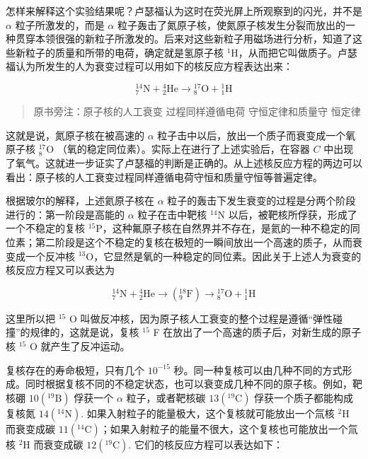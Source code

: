 怎样来解释这个实验结果呢？卢瑟福认为这时在荧光屏上所观察到的闪光，并不是
\(\alpha\) 粒子所激发的，而是 \(\alpha\)
粒子轰击了氮原子核，使氮原子核发生分裂而放出的一种贯穿本领很强的新粒子所激发的。后来对这些新粒子用磁场进行分析，知道了这些新粒子的质量和所带的电荷，确定就是氢原子核
\(^{1}\mathrm{H}\)，从而把它叫做质子。卢瑟福认为所发生的人为衰变过程可以用如下的核反应方程表达出来：

\[
{ } _ {7}^{14}\mathrm{N}+{ } _ {2}^{4}\mathrm{He}\longrightarrow { } _ {8}^{17}\mathrm{O}+{ } _ {1}^{1}\mathrm{H}
\]

\begin{quote}
原书旁注：原子核的人工衰变 过程同样遵循电荷 守恒定律和质量守 恒定律
\end{quote}

这就是说，氮原子核在被高速的 \(\alpha\)
粒子击中以后，放出一个质子而衰变成一个氧原子核 \({}^{17}_{8}\mathrm{O}\)
（氧的稳定同位素）。实际上在进行了上述实验后，在容器 \(C\)
中出现了氧气。这就进一步证实了卢瑟福的判断是正确的。从上述核反应方程的两边可以看出：原子核的人工衰变过程同样遵循电荷守恒和质量守恒等普遍定律。

根据玻尔的解释，上述氦原子核在 \(\alpha\)
粒子的轰击下发生衰变的过程是分两个阶段进行的：第一阶段是高能的
\(\alpha\) 粒子在击中靶核 \(^{14}\mathrm{N}\)
以后，被靶核所俘获，形成了一个不稳定的复核
\(^{15}\mathrm{P}\)，这种氟原子核在自然界并不存在，是氦的一种不稳定的同位素；第二阶段是这个不稳定的复核在极短的一瞬间放出一个高速的质子，从而衰变成一个反冲核
\(^{13}\mathrm{O}\)，它显然是氧的一种稳定的同位素。因此关于上述人为衰变的核反应方程又可以表达为

\[
{ } _ {7}^{14}\mathrm{N}+{ } _ {2}^{4}\mathrm{He}\longrightarrow ( { } _ {9}^{18}\mathrm{F})\longrightarrow { } _ {8}^{17}\mathrm{O}+{ } _ {1}^{1}\mathrm{H}
\]

这里所以把 \(^{15}\) O
叫做反冲核，因为原子核人工衰变的整个过程是遵循``弹性碰撞''的规律的，这就是说，复核
\(^{15}\) F 在放出了一个高速的质子后，对新生成的原子核 \(^{15}\) O
就产生了反冲运动。

复核存在的寿命极短，只有几个 \(10^{-15}\)
秒。同一种复核可以由几种不同的方式形成。同时根据复核不同的不稳定状态，也可以衰变成几种不同的原子核。例如，靶核硼
\(10(^{19}\mathrm{B})\) 俘获一个 \(\alpha\) 粒子，或者靶核碳
\(13(^{19}\mathrm{C})\) 俘获一个质子都能构成复核氮
\(14(^{14}\mathrm{N})\).
如果入射粒子的能量极大，这个复核就可能放出一个氚核 \({}^{2}\mathrm{H}\)
而衰变成碳
\(11(^{14}\mathrm{C})\)；如果入射粒子的能量不很大，这个复核也可能放出一个氚核
\({}^{2}\mathrm{H}\) 而衰变成碳 \(12(^{19}\mathrm{C})\).
它们的核反应方程可以表达如下：

